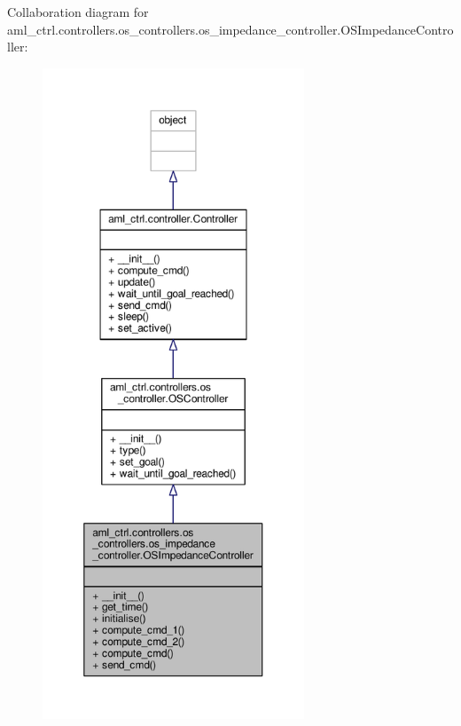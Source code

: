 Collaboration diagram for aml\-\_\-ctrl.\-controllers.\-os\-\_\-controllers.\-os\-\_\-impedance\-\_\-controller.\-O\-S\-Impedance\-Controller\-:
\nopagebreak
\begin{figure}[H]
\begin{center}
\leavevmode
\includegraphics[height=550pt]{classaml__ctrl_1_1controllers_1_1os__controllers_1_1os__impedance__controller_1_1_o_s_impedance_controller__coll__graph}
\end{center}
\end{figure}
